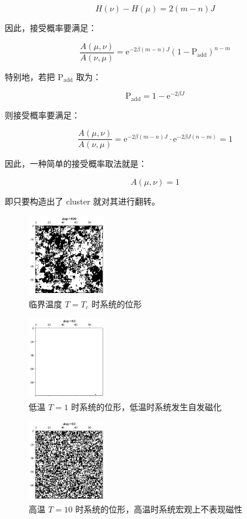 \documentclass[aps,prl,twocolumn,groupedaddress]{revtex4-2}
\begin{document}
$$
H(\nu)-H(\mu) = 2(m-n)J
$$

因此，接受概率要满足：

$$
\frac{A(\mu,\nu) }{A(\nu,\mu) } 
=\mathrm{e}^{-2\beta (m-n)J}\left(1-\mathrm{P_{add}} \right)^{n-m}
$$

特别地，若把 $\mathrm{P}_{\mathrm{add}} $ 取为：

$$
\mathrm{P_{add}}
=1-\mathrm{e}^{-2\beta J}
$$

则接受概率要满足：

$$
\frac{A(\mu,\nu) }{A(\nu,\mu) } 
=\mathrm{e}^{-2\beta (m-n)J}\cdot \mathrm{e}^{-2\beta J(n-m)}
=1
$$

因此，一种简单的接受概率取法就是：

$$
A(\mu,\nu)
=1
$$

即只要构造出了 cluster 就对其进行翻转。

\begin{figure}[htbp]
    \centering
    \includegraphics[width=0.3\textwidth]{img/fig3.png}
    \caption{临界温度 $T=T_c$ 时系统的位形}
    \label{fig3}
\end{figure}

\begin{figure}[htbp]
    \centering
    \includegraphics[width=0.3\textwidth]{img/fig4.png}
    \caption{低温 $T=1$ 时系统的位形，低温时系统发生自发磁化}
    \label{fig4}
\end{figure}

\begin{figure}[H]
    \centering
    \includegraphics[width=0.3\textwidth]{img/fig5.png}
    \caption{高温 $T=10$ 时系统的位形，高温时系统宏观上不表现磁性}
    \label{fig5}
\end{figure}
\end{document}
